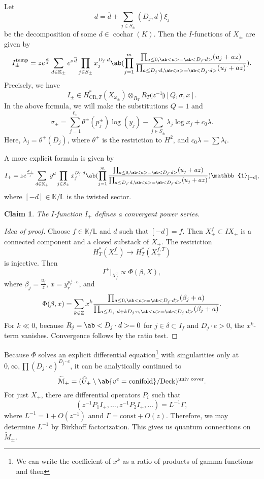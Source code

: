 \documentclass[leqno, openany]{memoir}
\newtheorem{claim}[thm]{Claim}
\theoremstyle{definition}
\theoremstyle{remark}
\theoremstyle{plain}
\theoremstyle{definition}
\theoremstyle{remark}
\newcommand{\Z}{\mathbb{Z}}
\renewcommand{\K}{\mathbb{K}}
\renewcommand{\L}{\mathbb{L}}
\newcommand{\mc}[1]{\mathcal{#1}}
\newcommand{\mr}[1]{\mathrm{#1}}
\newcommand{\on}[1]{\operatorname{#1}}
\newcommand{\ol}[1]{\overline{#1}}
\newcommand{\wt}[1]{\widetilde{#1}}
\newcommand{\wh}[1]{\widehat{#1}}
\begin{document}
Let 
\[ d = \ol{d} + \sum_{j \in S_{\pm}} (D_j, d) \xi_j \]
be  the decomposition of some $d \in \on{cochar}(K)$. Then the $I$-functions of $X_{\pm}$ are given by
\[ I_{\pm}^{\mr{temp}} = z e^{\frac{\sigma}{z}} \sum_{d \in \K_{\pm}}e^{\sigma \ol{d}} \prod_{j \in S_{\pm}} x_j^{D_j \cdot d} \ab(\prod_{j=1}^m \frac{\prod_{a\leq 0,\ab<a> = \ab<D_j\cdot d>}(u_j + az)}{\prod_{a \leq D_j \cdot d, \ab<a> = \ab<D_j\cdot d>}(u_j + az)}). \]
Precisely, we have
\[ I_{\pm} \in H_{\mr{CR}, T}^*(X_{\omega_{\pm}}) \otimes_{R_T} R_T\llparenthesis z^{-1} \rrparenthesis [Q,\sigma,x]. \]
In the above formula, we will make the substitutions $Q=1$ and
\[ \sigma_{\pm} = \sum_{j=1}^{\ell_{\pm}} \theta^{\pm}(p_j^{\pm}) \log(y_j) - \sum_{j \in S_{\pm}} \lambda_j \log x_j + c_0 \lambda. \]
Here, $\lambda_j = \theta^+(D_j)$, where $\theta^+$ is the restriction to $H^2$, and $c_0 \lambda = \sum \lambda_i$.

A more explicit formula is given by
\[ I_{+} = z e^{\frac{\sigma_+}{z}} \sum_{d \in \K_{+}}y^d \prod_{j \in S_{\pm}} x_j^{D_j \cdot d} \ab(\prod_{j=1}^m \frac{\prod_{a\leq 0,\ab<a> = \ab<D_j\cdot d>}(u_j + az)}{\prod_{a \leq D_j \cdot d, \ab<a> = \ab<D_j\cdot d>}(u_j + az)}) \mathbb{1}_{[-d]}, \]
where $[-d] \in \K/\L$ is the twisted sector.

\begin{claim}
    The $I$-function $I_+$ defines a convergent power series.
\end{claim}

\begin{proof}[Idea of proof]
    Choose $f \in \K/\L$ and $d$ such that $[-d] = f$. Then $X_+^f \subset IX_+$ is a connected component and a closed substack of $X_+$. The restriction
    \[ H_T^*(X_+^f) \to H_T^*(X_+^{f,T}) \]
    is injective. Then
    \[ I^+|_{X_f^T} \propto \Phi(\beta, X), \]
    where $\beta_j = \frac{u_j}{z}$, $x = y_r^{p_r^+ \cdot e}$, and
    \[ \Phi(\beta, x) = \sum_{k \in \Z} x^k \frac{\prod_{a\leq 0,\ab<a> = \ab<D_j\cdot d>}(\beta_j + a)}{\prod_{a \leq D_j \cdot d + k D_j \cdot e, \ab<a> = \ab<D_j\cdot d>}(\beta_j + a)}. \]
    For $k \ll 0$, because $R_j = \ab<D_j \cdot d> = 0$ for $j \in \delta \subset I_f$ and $D_j \cdot e > 0$, the $x^k$-term vanishes. Convergence follows by the ratio test.
\end{proof}

Because $\Phi$ solves an explicit differential equation\footnote{We can write the coefficient of $x^k$ as a ratio of products of gamma functions and then } with singularities only at $0, \infty, \prod (D_j \cdot e)^{D_j \cdot e}$, it can be analytically continued to
\[ \wt{\mc{M}}_+ = (\wh{U}_+ \setminus \ab\{v^e = \mr{conifold}\} / \mr{Deck})^{\text{univ cover}}. \]
For just $X_+$, there are differential operators $P_i$ such that
\[ ( z^{-1}P_1 I_+, \ldots, z^{-1}P_2 I_+ , \ldots) = L^{-1} \Gamma, \]
where $L^{-1} = 1 + O(z^{-1})$ annd $\Gamma = \mr{const} + O(z)$. Therefore, we may determine $L^{-1}$ by Birkhoff factorization. This gives us quantum connections on $\wt{M}_{\pm}$.
\end{document}
